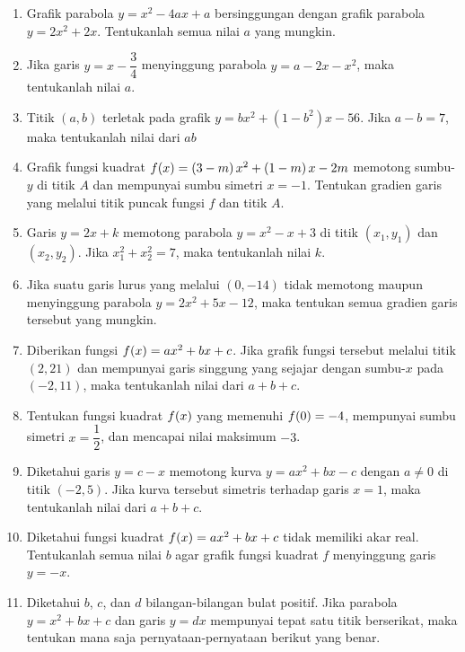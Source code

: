 \begin{enumerate}[topsep=0pt]
		\item Grafik parabola $ y = x^{2} - 4ax + a $ bersinggungan dengan grafik parabola $ y = 2x^{2} + 2x $. Tentukanlah semua nilai $ a $ yang mungkin.
		\item Jika garis $ y = x - \dfrac{3}{4} $ menyinggung parabola $ y = a - 2x - x^{2} $, maka tentukanlah nilai $ a $.
		\item Titik $ \left(a, b\right) $ terletak pada grafik $ y = bx^{2} + \left(1 - b^{2}\right)x - 56 $. Jika $ a - b = 7 $, maka tentukanlah nilai dari $ ab $
		\item Grafik fungsi kuadrat $ \mathop{}\!{f}{\left({x}\right)} = \left(3 - m\right)x^{2} + \left(1 - m\right)x - 2m $ memotong sumbu-$ y $ di titik $ A $ dan mempunyai sumbu simetri $ x = -1 $. Tentukan gradien garis yang melalui titik puncak fungsi $ f $ dan titik $ A $.
		\item Garis $ y = 2x + k $ memotong parabola $ y = x^{2} - x + 3 $ di titik $ \left(x_{1}, y_{1}\right) $ dan $ \left(x_{2}, y_{2}\right) $. Jika $ x_{1}^{2} + x_{2}^{2} = 7 $, maka tentukanlah nilai $ k $.
		\item Jika suatu garis lurus yang melalui $ \left(0, -14\right) $ tidak memotong maupun menyinggung parabola $ y = 2x^{2} + 5x - 12 $, maka tentukan semua gradien garis tersebut yang mungkin.
		\item Diberikan fungsi $ \mathop{}\!{f}{\left({x}\right)} = ax^{2} + bx + c $. Jika grafik fungsi tersebut melalui titik $ \left(2, 21\right) $ dan mempunyai garis singgung yang sejajar dengan sumbu-$ x $ pada $ \left(-2, 11\right) $, maka tentukanlah nilai dari $ a + b + c $.
		\item Tentukan fungsi kuadrat $ \mathop{}\!{f}{\left({x}\right)} $ yang memenuhi $ \mathop{}\!{f}{\left({0}\right)} = -4 $, mempunyai sumbu simetri $ x = \dfrac{1}{2} $, dan mencapai nilai maksimum $ -3 $.
		\item Diketahui garis $ y = c - x $ memotong kurva $ y = ax^{2} + bx - c $ dengan $ a \ne 0 $ di titik $ \left(-2, 5\right) $. Jika kurva tersebut simetris terhadap garis $ x = 1 $, maka tentukanlah nilai dari $ a + b + c $.
		\item Diketahui fungsi kuadrat $ \mathop{}\!{f}{\left({x}\right)} = ax^{2} + bx + c $ tidak memiliki akar real. Tentukanlah semua nilai $ b $ agar grafik fungsi kuadrat $ f $ menyinggung garis $ y = -x $.
		\item Diketahui $ b $, $ c $, dan $ d $ bilangan-bilangan bulat positif. Jika parabola $ y = x^{2} + bx + c $ dan garis $ y = dx $ mempunyai tepat satu titik berserikat, maka tentukan mana saja pernyataan-pernyataan berikut yang benar.

\end{enumerate}

